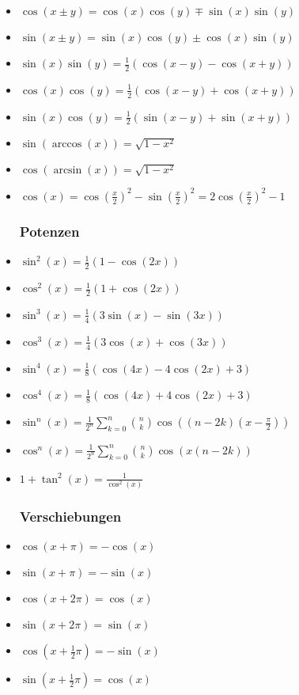 \documentclass[a3paper, 11pt, landscape]{scrartcl}
\begin{document}
\begin{multicols*}{3}
\begin{itemize}
	    \item $\cos(x\pm y)=\cos(x)\cos(y)\mp\sin(x)\sin(y)$
	    \item $\sin(x\pm y)=\sin(x)\cos(y)\pm\cos(x)\sin(y)$
	    \item $\sin(x)\sin(y)=\frac{1}{2}(\cos(x-y)-\cos(x+y))$
    	\item $\cos(x)\cos(y)=\frac{1}{2}(\cos(x-y)+\cos(x+y))$
    	\item $\sin(x)\cos(y)=\frac{1}{2}(\sin(x-y)+\sin(x+y))$
    	
    	\item $\sin(\arccos(x))=\sqrt{1-x^2}$
    	\item $\cos(\arcsin(x))=\sqrt{1-x^2}$
    	
    	\item $\cos(x) = \cos(\frac{x}{2})^2 - \sin( \frac{x}{2})^2 = 2\cos(\frac{x}{2})^2 - 1$
    	
    	\subsubsection{Potenzen}
	    \item $\sin^2(x)=\frac{1}{2}(1-\cos(2x))$
    	\item $\cos^2(x)=\frac{1}{2}(1+\cos(2x))$
    	\item $\sin ^{3}(x)=\frac{1}{4}(3 \sin (x)-\sin (3 x))$
        \item $\cos ^{3}(x)=\frac{1}{4}(3 \cos (x)+\cos (3 x))$
    	\item $\sin ^{4}(x)=\frac{1}{8}(\cos (4 x)-4 \cos (2 x)+3)$
    	\item $\cos ^{4}(x)=\frac{1}{8}(\cos (4x)+4 \cos (2 x)+3)$
	    \item $\sin^n(x)=\frac{1}{2^n}\sum_{k=0}^{n}\binom{n}{k}\cos\left((n-2k)(x-\frac{\pi}{2})\right)$
    	\item $\cos^n(x)=\frac{1}{2^n}\sum_{k=0}^{n}\binom{n}{k}\cos\left(x(n-2k)\right)$
    	\item$ 1+\tan^2(x)=\frac{1}{\cos^2(x)}$
	    
	    \subsubsection{Verschiebungen}
	    \item $\cos (x+\pi)=-\cos (x)$
	    \item $\sin (x+\pi)=-\sin (x)$
	    \item $\cos (x+2 \pi)=\cos (x)$
	    \item $\sin (x+2 \pi)=\sin (x)$
	    \item $\cos \left(x+\frac{1}{2} \pi\right)=-\sin (x)$
	    \item $\sin \left(x+\frac{1}{2} \pi\right)=\cos (x)$
	    

\end{itemize}
\end{multicols*}
\end{document}
